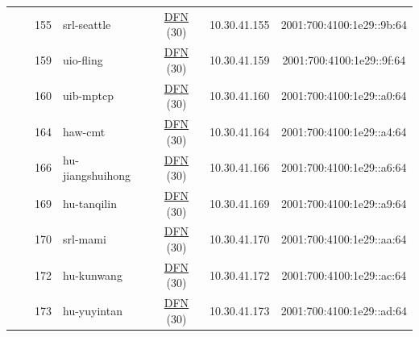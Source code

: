 \begin{small}
\begin{center}
\begin{longtable}{|c|c|c|c|c|c|c|c|}
  &  & \tiny{155} & \multicolumn{1}{|l|}{\tiny{srl-seattle}} & \multicolumn{2}{|c|}{\tiny{\href{https://www.dfn.de}{DFN} (30)}} & \tiny{10.30.41.155} & \tiny{2001:700:4100:1e29::9b:64} \\* \cline{3-3}\cline{4-4}\cline{5-5}\cline{6-6}\cline{7-7}\cline{8-8}
  &  & \tiny{159} & \multicolumn{1}{|l|}{\tiny{uio-fling}} & \multicolumn{2}{|c|}{\tiny{\href{https://www.dfn.de}{DFN} (30)}} & \tiny{10.30.41.159} & \tiny{2001:700:4100:1e29::9f:64} \\* \cline{3-3}\cline{4-4}\cline{5-5}\cline{6-6}\cline{7-7}\cline{8-8}
  &  & \tiny{160} & \multicolumn{1}{|l|}{\tiny{uib-mptcp}} & \multicolumn{2}{|c|}{\tiny{\href{https://www.dfn.de}{DFN} (30)}} & \tiny{10.30.41.160} & \tiny{2001:700:4100:1e29::a0:64} \\* \cline{3-3}\cline{4-4}\cline{5-5}\cline{6-6}\cline{7-7}\cline{8-8}
  &  & \tiny{164} & \multicolumn{1}{|l|}{\tiny{haw-cmt}} & \multicolumn{2}{|c|}{\tiny{\href{https://www.dfn.de}{DFN} (30)}} & \tiny{10.30.41.164} & \tiny{2001:700:4100:1e29::a4:64} \\* \cline{3-3}\cline{4-4}\cline{5-5}\cline{6-6}\cline{7-7}\cline{8-8}
  &  & \tiny{166} & \multicolumn{1}{|l|}{\tiny{hu-jiangshuihong}} & \multicolumn{2}{|c|}{\tiny{\href{https://www.dfn.de}{DFN} (30)}} & \tiny{10.30.41.166} & \tiny{2001:700:4100:1e29::a6:64} \\* \cline{3-3}\cline{4-4}\cline{5-5}\cline{6-6}\cline{7-7}\cline{8-8}
  &  & \tiny{169} & \multicolumn{1}{|l|}{\tiny{hu-tanqilin}} & \multicolumn{2}{|c|}{\tiny{\href{https://www.dfn.de}{DFN} (30)}} & \tiny{10.30.41.169} & \tiny{2001:700:4100:1e29::a9:64} \\* \cline{3-3}\cline{4-4}\cline{5-5}\cline{6-6}\cline{7-7}\cline{8-8}
  &  & \tiny{170} & \multicolumn{1}{|l|}{\tiny{srl-mami}} & \multicolumn{2}{|c|}{\tiny{\href{https://www.dfn.de}{DFN} (30)}} & \tiny{10.30.41.170} & \tiny{2001:700:4100:1e29::aa:64} \\* \cline{3-3}\cline{4-4}\cline{5-5}\cline{6-6}\cline{7-7}\cline{8-8}
  &  & \tiny{172} & \multicolumn{1}{|l|}{\tiny{hu-kunwang}} & \multicolumn{2}{|c|}{\tiny{\href{https://www.dfn.de}{DFN} (30)}} & \tiny{10.30.41.172} & \tiny{2001:700:4100:1e29::ac:64} \\* \cline{3-3}\cline{4-4}\cline{5-5}\cline{6-6}\cline{7-7}\cline{8-8}
  &  & \tiny{173} & \multicolumn{1}{|l|}{\tiny{hu-yuyintan}} & \multicolumn{2}{|c|}{\tiny{\href{https://www.dfn.de}{DFN} (30)}} & \tiny{10.30.41.173} & \tiny{2001:700:4100:1e29::ad:64} \\* \cline{3-3}\cline{4-4}\cline{5-5}\cline{6-6}\cline{7-7}\cline{8-8}

\end{longtable}
\end{center}
\end{small}
